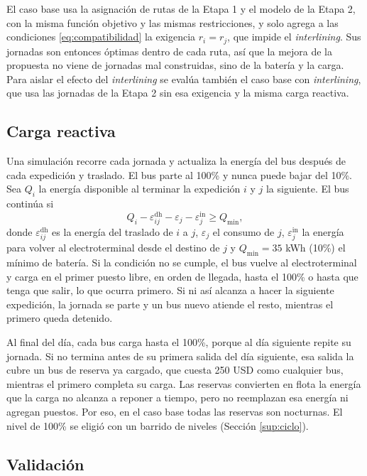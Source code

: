 El caso base usa la asignación de rutas de la Etapa 1 y el modelo de la Etapa 2, con la misma función objetivo y las mismas restricciones, y solo agrega a las condiciones \eqref{eq:compatibilidad} la exigencia $r_i = r_j$, que impide el \textit{interlining}. Sus jornadas son entonces óptimas dentro de cada ruta, así que la mejora de la propuesta no viene de jornadas mal construidas, sino de la batería y la carga. Para aislar el efecto del \textit{interlining} se evalúa también el caso base con \textit{interlining}, que usa las jornadas de la Etapa 2 sin esa exigencia y la misma carga reactiva.

\subsection{Carga reactiva}

Una simulación recorre cada jornada y actualiza la energía del bus después de cada expedición y traslado. El bus parte al 100\% y nunca puede bajar del 10\%. Sea $Q_i$ la energía disponible al terminar la expedición $i$ y $j$ la siguiente. El bus continúa si
\begin{equation}
    Q_i - \varepsilon^{\mathrm{dh}}_{ij} - \varepsilon_j - \varepsilon^{\mathrm{in}}_j \geq Q_{\min},
\end{equation}
donde $\varepsilon^{\mathrm{dh}}_{ij}$ es la energía del traslado de $i$ a $j$, $\varepsilon_j$ el consumo de $j$, $\varepsilon^{\mathrm{in}}_j$ la energía para volver al electroterminal desde el destino de $j$ y $Q_{\min} = 35$ kWh (10\%) el mínimo de batería. Si la condición no se cumple, el bus vuelve al electroterminal y carga en el primer puesto libre, en orden de llegada, hasta el 100\% o hasta que tenga que salir, lo que ocurra primero. Si ni así alcanza a hacer la siguiente expedición, la jornada se parte y un bus nuevo atiende el resto, mientras el primero queda detenido.

Al final del día, cada bus carga hasta el 100\%, porque al día siguiente repite su jornada. Si no termina antes de su primera salida del día siguiente, esa salida la cubre un bus de reserva ya cargado, que cuesta 250 USD como cualquier bus, mientras el primero completa su carga. Las reservas convierten en flota la energía que la carga no alcanza a reponer a tiempo, pero no reemplazan esa energía ni agregan puestos. Por eso, en el caso base todas las reservas son nocturnas. El nivel de 100\% se eligió con un barrido de niveles (Sección \ref{sup:ciclo}).

\subsection{Validación}

